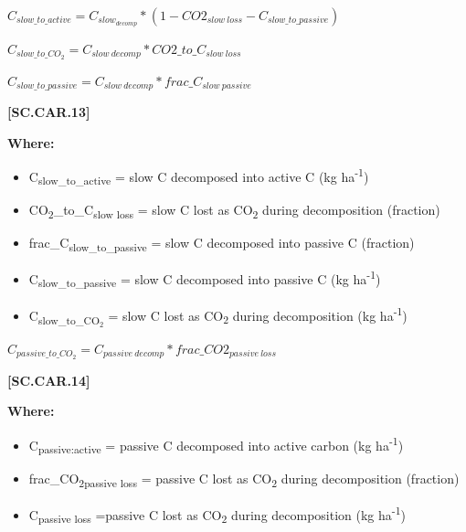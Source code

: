     \begin{center}
\(C_{slow\_to\_active}=C_{slow_{decomp}} * (1-CO2_{slow\ loss}-C_{slow\_to\_passive})\)
\vspace{0.1cm}

\(C_{slow\_to\_CO_2}=C_{slow\ decomp} * CO2\_to\_C_{slow\ loss}\)
\vspace{0.1cm}

\(C_{slow\_to\_passive}=C_{slow\ decomp} * frac\_C_{slow\ passive}\)
    \end{center}
        \vspace{0.5cm} 
    
            {\raggedleft \textbf{[SC.CAR.13]}\par}
            \vspace{0.5cm}

        \textbf{Where:}
            
        \begin{itemize}
            \item C\textsubscript{slow\_to\_active} = slow C decomposed into active C (kg ha\textsuperscript{-1})
            \item CO\textsubscript{2}\_to\_C\textsubscript{slow loss} = slow C lost as CO\textsubscript{2} during decomposition (fraction)
            \item frac\_C\textsubscript{slow\_to\_passive} = slow C decomposed into passive C (fraction)
            \item C\textsubscript{slow\_to\_passive} = slow C decomposed into passive C (kg ha\textsuperscript{-1})
            \item C\textsubscript{slow\_to\_CO$_2$} = slow C lost as CO\textsubscript{2} during decomposition (kg ha\textsuperscript{-1})
        \end{itemize}
        \vspace{0.5cm}

    \begin{center}
\(C_{passive\_to\_CO_2}=C_{passive\ decomp} * frac\_CO2_{passive\ loss}\)
    \end{center}
        \vspace{0.5cm} 
    
            {\raggedleft \textbf{[SC.CAR.14]}\par}
            \vspace{0.5cm}

        \textbf{Where:}

        \begin{itemize}
            \item C\textsubscript{passive:active} = passive C decomposed into active carbon (kg ha\textsuperscript{-1})
            \item frac\_CO\textsubscript{2}\textsubscript{passive loss} = passive C lost as CO\textsubscript{2} during decomposition (fraction)
            \item C\textsubscript{passive loss} =passive C lost as CO\textsubscript{2} during decomposition (kg ha\textsuperscript{-1})

        \end{itemize}
        \vspace{0.5cm}

